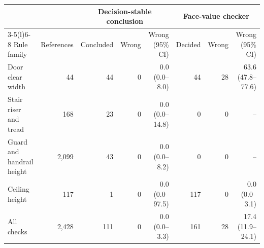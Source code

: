 \begin{tabular}{@{}lrrrrrrr@{}}
\toprule
 & & \multicolumn{3}{c}{Decision-stable conclusion} & \multicolumn{3}{c}{Face-value checker} \\
\cmidrule(lr){3-5}\cmidrule(l){6-8}
Rule family & References & Concluded & Wrong & Wrong (95\% CI) & Decided & Wrong & Wrong (95\% CI) \\
\midrule
Door clear width & 44 & 44 & 0 & 0.0 (0.0--8.0) & 44 & 28 & 63.6 (47.8--77.6) \\
Stair riser and tread & 168 & 23 & 0 & 0.0 (0.0--14.8) & 0 & 0 & -- \\
Guard and handrail height & 2,099 & 43 & 0 & 0.0 (0.0--8.2) & 0 & 0 & -- \\
Ceiling height & 117 & 1 & 0 & 0.0 (0.0--97.5) & 117 & 0 & 0.0 (0.0--3.1) \\
\addlinespace
All checks & 2,428 & 111 & 0 & 0.0 (0.0--3.3) & 161 & 28 & 17.4 (11.9--24.1) \\
\bottomrule
\end{tabular}
